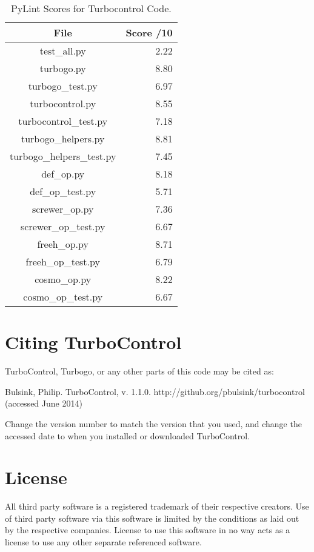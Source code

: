 \begin{table}[!htb]
  \centering
  \caption{PyLint Scores for Turbocontrol Code.}
    \begin{tabular}{cr}
    \toprule
    File  & Score /10 \\
    \midrule
    test\_all.py & 2.22 \\
    turbogo.py & 8.80 \\
    turbogo\_test.py & 6.97 \\
    turbocontrol.py & 8.55 \\
    turbocontrol\_test.py & 7.18 \\
    turbogo\_helpers.py & 8.81 \\
    turbogo\_helpers\_test.py & 7.45 \\
    def\_op.py & 8.18 \\
    def\_op\_test.py & 5.71 \\
    screwer\_op.py & 7.36 \\
    screwer\_op\_test.py & 6.67 \\
    freeh\_op.py & 8.71 \\
    freeh\_op\_test.py & 6.79 \\
    cosmo\_op.py & 8.22 \\
    cosmo\_op\_test.py & 6.67 \\
    \bottomrule
    \end{tabular}%
  \label{tab.pylint}
\end{table}%

\section{Citing TurboControl}

TurboControl, Turbogo, or any other parts of this code may be cited as:

Bulsink, Philip. TurboControl, v. 1.1.0. http://github.org/pbulsink/turbocontrol (accessed June 2014)

Change the version number to match the version that you used, and change the accessed date to when you installed or downloaded TurboControl. 

\section{License}

All third party software is a registered trademark of their respective creators. Use of third party software via this software is limited by the conditions as laid out by the respective companies. License to use this software in no way acts as a license to use any other separate referenced software.

